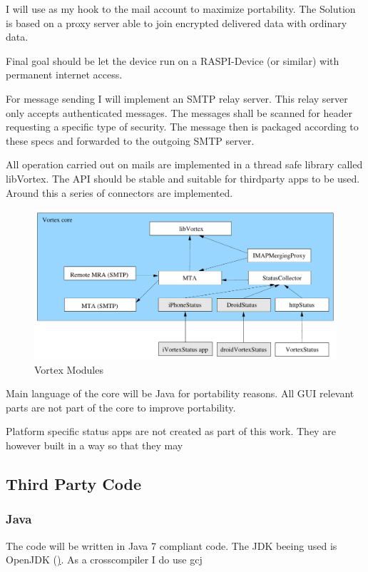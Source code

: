 I will use  as my hook to the mail account to maximize portability. The Solution is based on a  proxy server able to join encrypted delivered data with ordinary data.\par

Final goal should be let the device run on a RASPI-Device (or similar) with permanent internet access. \par

For message sending I will implement an SMTP relay server. This relay server only accepts authenticated messages. The messages shall be scanned for header requesting a specific type of security. The message then is packaged according to these specs and forwarded to the outgoing SMTP server.

All operation carried out on mails are implemented in a thread safe library called libVortex. The API should be stable and suitable for thirdparty apps to be used. Around this a series of connectors are implemented.

\begin{figure}[ht!]
  \centering\includegraphics[width=\textwidth]{inc/VortexModules}
  \caption{Vortex Modules}\label{fig:VortexModules}
\end{figure}

Main language of the core will be Java for portability reasons. All GUI relevant parts are not part of the core to improve portability.\par

Platform specific status apps are not created as part of this work. They are however built in a way so that they may

\subsection{Third Party Code}
\subsubsection{Java}
The code will be written in Java 7 compliant code. The JDK beeing used is OpenJDK (\href{http://openjdk.java.net/}). As a crosscompiler I do use gcj 
